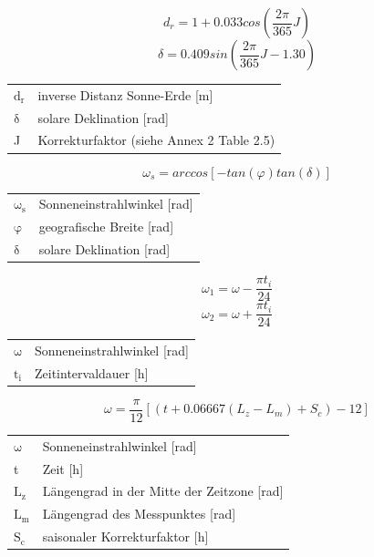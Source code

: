\begin{appendix}
\begin{description}
\begin{equation}
\label{eq:dr}
d_r=1+0.033cos\left(\frac{2\pi}{365}J\right)
\end{equation}
\begin{equation}
\label{eq:delta_radiation}
\delta=0.409sin\left(\frac{2\pi}{365}J-1.30\right)
\end{equation}
\begin{table}[H]
\centering
\begin{tabular}{ll}
$\mathrm{d_r}$ & inverse Distanz Sonne-Erde [m]\\
$\mathrm{\delta}$ & solare Deklination [rad]\\
J & Korrekturfaktor (siehe \cite{fao} Annex 2 Table 2.5)\\
\end{tabular}
\end{table}

\begin{equation}
\label{eq:omega_s}
\omega_s=arccos[-tan(\varphi)tan(\delta)]
\end{equation}
\begin{table}[H]
\centering
\begin{tabular}{ll}
$\mathrm{\omega_s}$ & Sonneneinstrahlwinkel [rad]\\
$\mathrm{\varphi}$ & geografische Breite [rad]\\
$\mathrm{\delta}$ & solare Deklination [rad]\\
\end{tabular}
\end{table}

\begin{equation}
\label{eq:omega_i}
\omega_1=\omega-\frac{\pi t_i}{24}
\end{equation}
\begin{equation}
\omega_2=\omega+\frac{\pi t_i}{24}
\end{equation}
\begin{table}[H]
\centering
\begin{tabular}{ll}
$\mathrm{\omega}$ & Sonneneinstrahlwinkel [rad]\\
$\mathrm{t_i}$ & Zeitintervaldauer [h]\\
\end{tabular}
\end{table}

\begin{equation}
\label{eq:omega}
\omega=\frac{\pi}{12}[(t+0.06667(L_z-L_m)+S_c)-12]
\end{equation}
\begin{table}[H]
\centering
\begin{tabular}{ll}
$\mathrm{\omega}$ & Sonneneinstrahlwinkel [rad]\\
t & Zeit [h]\\
$\mathrm{L_z}$ & Längengrad in der Mitte der Zeitzone [rad]\\
$\mathrm{L_m}$ & Längengrad des Messpunktes [rad]\\
$\mathrm{S_c}$ & saisonaler Korrekturfaktor [h]\\
\end{tabular}
\end{table}


\end{description}
\end{appendix}
